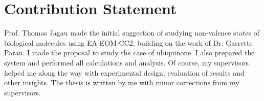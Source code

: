 \chapter*{Contribution Statement}

Prof. Thomas Jagau made the initial suggestion of studying non-valence states of biological molecules using EA-EOM-CC2, building on the work of Dr. Garrette Paran. I made the proposal to study the case of ubiquinone. I also prepared the system and performed all calculations and analysis. Of course, my supervisors helped me along the way with experimental design, evaluation of results and other insights. The thesis is written by me with minor corrections from my supervisors.